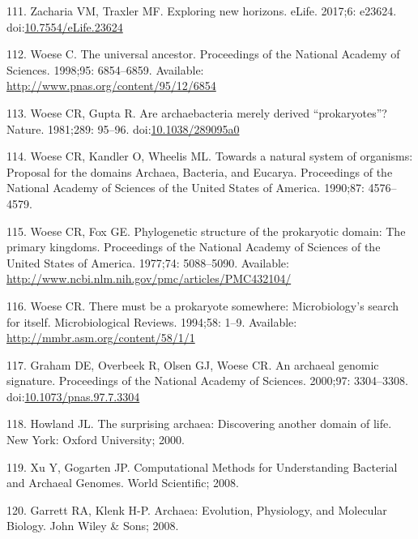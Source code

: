 \documentclass[12pt,twoside]{reedthesis}
\begin{document}
  \hypertarget{ref-zachariaux5fexploringux5f2017}{}
  111. Zacharia VM, Traxler MF. Exploring new horizons. eLife. 2017;6:
  e23624.
  doi:\href{https://doi.org/10.7554/eLife.23624}{10.7554/eLife.23624}
  
  \hypertarget{ref-woeseux5funiversalux5f1998}{}
  112. Woese C. The universal ancestor. Proceedings of the National
  Academy of Sciences. 1998;95: 6854--6859. Available:
  \url{http://www.pnas.org/content/95/12/6854}
  
  \hypertarget{ref-woeseux5fareux5f1981}{}
  113. Woese CR, Gupta R. Are archaebacteria merely derived
  ``prokaryotes''? Nature. 1981;289: 95--96.
  doi:\href{https://doi.org/10.1038/289095a0}{10.1038/289095a0}
  
  \hypertarget{ref-woeseux5ftowardsux5f1990}{}
  114. Woese CR, Kandler O, Wheelis ML. Towards a natural system of
  organisms: Proposal for the domains Archaea, Bacteria, and Eucarya.
  Proceedings of the National Academy of Sciences of the United States of
  America. 1990;87: 4576--4579.
  
  \hypertarget{ref-woeseux5fphylogeneticux5f1977}{}
  115. Woese CR, Fox GE. Phylogenetic structure of the prokaryotic domain:
  The primary kingdoms. Proceedings of the National Academy of Sciences of
  the United States of America. 1977;74: 5088--5090. Available:
  \url{http://www.ncbi.nlm.nih.gov/pmc/articles/PMC432104/}
  
  \hypertarget{ref-woeseux5fthereux5f1994}{}
  116. Woese CR. There must be a prokaryote somewhere: Microbiology's
  search for itself. Microbiological Reviews. 1994;58: 1--9. Available:
  \url{http://mmbr.asm.org/content/58/1/1}
  
  \hypertarget{ref-grahamux5farchaealux5f2000}{}
  117. Graham DE, Overbeek R, Olsen GJ, Woese CR. An archaeal genomic
  signature. Proceedings of the National Academy of Sciences. 2000;97:
  3304--3308.
  doi:\href{https://doi.org/10.1073/pnas.97.7.3304}{10.1073/pnas.97.7.3304}
  
  \hypertarget{ref-howlandux5fsurprisingux5f2000}{}
  118. Howland JL. The surprising archaea: Discovering another domain of
  life. New York: Oxford University; 2000.
  
  \hypertarget{ref-xuux5fcomputationalux5f2008}{}
  119. Xu Y, Gogarten JP. Computational Methods for Understanding
  Bacterial and Archaeal Genomes. World Scientific; 2008.
  
  \hypertarget{ref-garrettux5farchaeaux5f2008}{}
  120. Garrett RA, Klenk H-P. Archaea: Evolution, Physiology, and
  Molecular Biology. John Wiley \& Sons; 2008.
  
\end{document}
